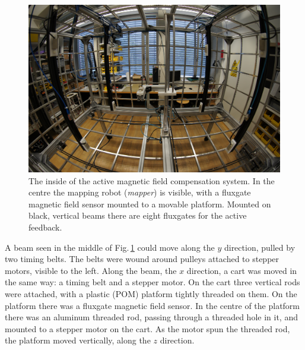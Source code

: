 \begin{figure}
  \centering
  \includegraphics[width=0.75\linewidth]{gfx/prototype/DSC03476.JPG}
  \caption{The inside of the active magnetic field compensation system. In the centre the mapping robot (\emph{mapper}) is visible, with a fluxgate magnetic field sensor mounted to a movable platform. Mounted on black, vertical beams there are eight fluxgates for the active feedback.}\label{fig:prototype_photo_inside}
\end{figure}

A beam seen in the middle of Fig.\,\ref{fig:prototype_photo_inside} could move along the $y$ direction, pulled by two timing belts. The belts were wound around pulleys attached to stepper motors, visible to the left. Along the beam, the $x$ direction, a cart was moved in the same way: a timing belt and a stepper motor. On the cart three vertical rods were attached, with a plastic (POM) platform tightly threaded on them. On the platform there was a fluxgate magnetic field sensor.
In the centre of the platform there was an aluminum threaded rod, passing through a threaded hole in it, and mounted to a stepper motor on the cart. As the motor spun the threaded rod, the platform moved vertically, along the $z$ direction.

